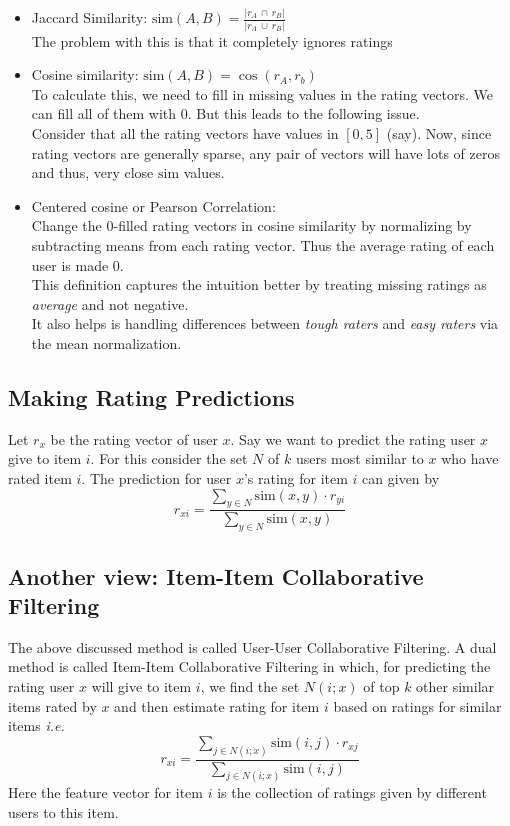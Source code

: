 \documentclass{article}
\newcommand{\Sim}{\text{sim}}
\begin{document}
\begin{itemize}
    \item Jaccard Similarity: $\Sim(A,B) = \frac{|r_A\,\cap\,r_B|}{|r_A\,\cup\,r_B|}$\\
    The problem with this is that it completely ignores ratings
    \item Cosine similarity: $\Sim(A, B) = \cos(r_A, r_b)$ \\
    \indent To calculate this, we need to fill in missing values in the rating vectors. We can fill all of them with 0. But this leads to the following issue.\\
    Consider that all the rating vectors have values in $[0,5]$ (say). Now, since rating vectors are generally sparse, any pair of vectors will have lots of zeros and thus, very close $\Sim$ values.
    \item Centered cosine or Pearson Correlation:\\
    Change the $0$-filled rating vectors in cosine similarity by normalizing by subtracting means from each rating vector. Thus the average rating of each user is made $0$. \\
    This definition captures the intuition better by treating missing ratings as \textit{average} and not negative.\\
    It also helps is handling differences between \textit{tough raters} and \textit{easy raters} via the mean normalization.
\end{itemize}

\subsection{Making Rating Predictions}
Let $r_x$ be the rating vector of user $x$. Say we want to predict the rating user $x$ give to item $i$. For this consider the set $N$ of $k$ users most similar to $x$ who have rated item $i$. The prediction for user $x$'s rating for item $i$ can given by $$r_{xi} = \frac{\sum_{y\in N} \Sim(x,y) \cdot r_{yi}}{\sum_{y \in N} \Sim(x,y)}$$

\subsection{Another view: Item-Item Collaborative Filtering}
The above discussed method is called User-User Collaborative Filtering. A dual method is called Item-Item Collaborative Filtering in which, for predicting the rating user $x$ will give to item $i$, we find the set $N(i;x)$ of top $k$ other similar items rated by $x$ and then estimate rating for item $i$ based on ratings for similar items \textit{i.e.}
$$ r_{xi} = \frac{\sum_{j\in N(i;x)} \Sim(i,j) \cdot r_{xj}}{\sum_{j\in N(i;x)} \Sim(i,j)}$$
Here the feature vector for item $i$ is the collection of ratings given by different users to this item.
\end{document}
